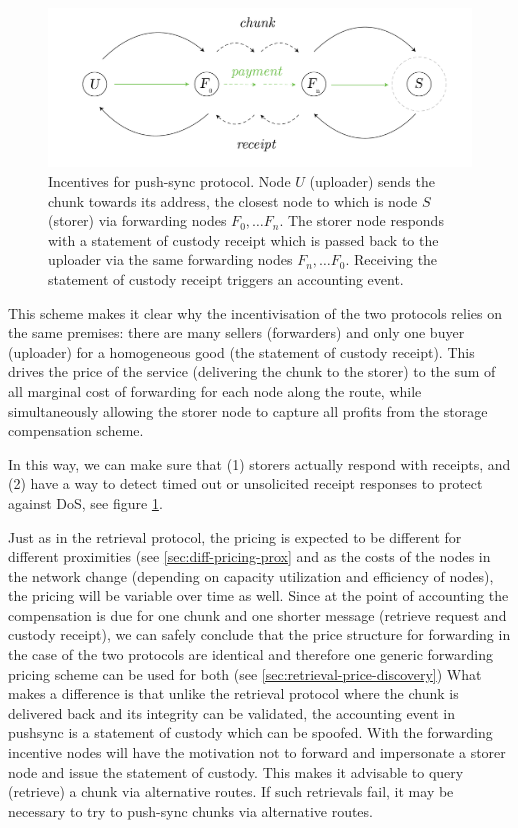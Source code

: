 \begin{figure}[htbp]
\centering
\includegraphics[width=\textwidth]{fig/push-payment.pdf}
\caption[Incentives for push-sync protocol \statusgreen]{Incentives for push-sync protocol. Node $U$ (uploader) sends the chunk towards its address, the closest node to which is node $S$ (storer) via forwarding nodes $F_0, \ldots F_n$. The storer node responds with a statement of custody receipt which is passed back to the uploader via the same forwarding nodes $F_n, \ldots F_0$. Receiving the statement of custody receipt triggers an accounting event.}
\label{fig:syncing-swap}
\end{figure}

This scheme makes it clear why the incentivisation of the two protocols relies on the same premises: there are many sellers (forwarders) and only one buyer (uploader) for a homogeneous good (the statement of custody receipt). This drives the price of the service (delivering the chunk to the storer) to the sum of all marginal cost of forwarding for each node along the route, while simultaneously allowing the storer node to capture all profits from the storage compensation scheme.

In this way, we can make sure that (1) storers actually respond with receipts, and (2) have a way to detect timed out or unsolicited receipt responses to protect against DoS, see figure \ref{fig:syncing-swap}.

Just as in the retrieval protocol, the pricing is expected to be different for different proximities (see \ref{sec:diff-pricing-prox} and as the costs of the nodes in the network change (depending on capacity utilization and efficiency of nodes), the pricing will be variable over time as well. Since at the point of accounting the compensation is due for one chunk and one shorter message (retrieve request and custody receipt), we can safely conclude that the price structure for forwarding in the case of the two protocols are identical and therefore one generic forwarding pricing scheme can be used for both (see  \ref{sec:retrieval-price-discovery}) 
What makes a difference is that unlike the retrieval protocol where the chunk is delivered back and its integrity can be validated, the accounting event in pushsync is a statement of custody which can be spoofed. With the forwarding incentive nodes will have the motivation not to forward and impersonate a storer node and issue the statement of  custody. This makes it advisable to query (retrieve) a chunk via alternative routes. If  such  retrievals fail, it may be necessary to try to push-sync chunks via alternative routes. 
 

